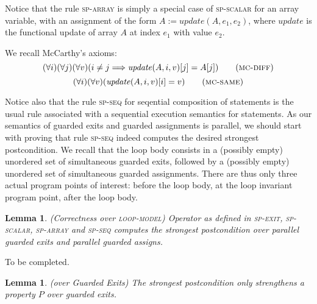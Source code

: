 \documentclass[a4paper,10pt]{article}
\newcommand{\yannick}[1]{{\color{red} #1}}
\newcommand{\impl}{\ensuremath{\Longrightarrow}}
\newcommand{\update}[3]{\ensuremath{\mathit{update}{(#1,#2,#3)}}\xspace}
\newcommand{\loopmodel}{\textsc{loop-model}\xspace}
\newcommand{\spexit}{\textsc{sp-exit}\xspace}
\newcommand{\spscalar}{\textsc{sp-scalar}\xspace}
\newcommand{\sparray}{\textsc{sp-array}\xspace}
\newcommand{\spseq}{\textsc{sp-seq}\xspace}
\newcommand{\mcdiff}{\textsc{mc-diff}\xspace}
\newcommand{\mcsame}{\textsc{mc-same}\xspace}
\newtheorem{lemma}[theorem]{Lemma}
\newenvironment{proof}[1][Proof.]{\begin{trivlist}
\item[\hskip \labelsep {\bfseries #1}]}{\end{trivlist}}
\begin{document}
Notice that the rule \sparray is simply a special case of \spscalar for an
array variable, with an assignment of the form $A := \update{A}{e_1}{e_2}$,
where $\mathit{update}$ is the functional update of array $A$ at index $e_1$
with value $e_2$.

We recall McCarthy's axioms:
\begin{equation}
(\forall i)(\forall j)(\forall v)(i \neq j \impl \update{A}{i}{v}[j] = A[j])
\tag{\mcdiff}
\end{equation}
\begin{equation}
(\forall i)(\forall v)(\update{A}{i}{v}[i] = v) \tag{\mcsame}
\end{equation}

Notice also that the rule \spseq for seqential composition of statements is the
usual rule associated with a sequential execution semantics for statements. As
our semantics of guarded exits and guarded assignments is parallel, we should
start with proving that rule \spseq indeed computes the desired strongest
postcondition. We recall that the loop body consists in a (possibly empty)
unordered set of simultaneous guarded exits, followed by a (possibly empty)
unordered set of simultaneous guarded assignments. There are thus only three
actual program points of interest: before the loop body, at the loop invariant
program point, after the loop body.

\begin{lemma}
  \emph{(\spostsym Correctness over \loopmodel)} Operator \spostsym as defined in \spexit,
  \spscalar, \sparray and \spseq computes the strongest postcondition over
  parallel guarded exits and parallel guarded assigns.
\label{lemma:sp-correctness}
\end{lemma}

\begin{proof}
  \yannick{To be completed.}
\end{proof}

\begin{lemma}
  \emph{(\spostsym over Guarded Exits)} The strongest postcondition only
  strengthens a property $P$ over guarded exits.
\label{lemma:sp-guarded-exists}
\end{lemma}
\end{document}

